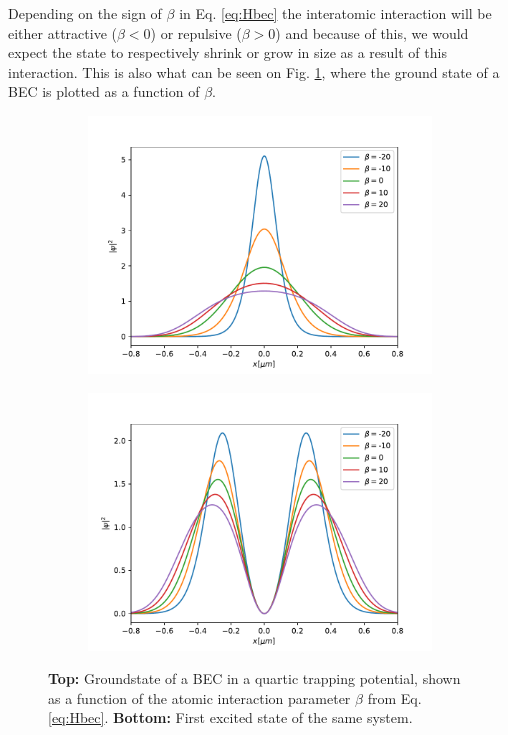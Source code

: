\documentclass[a4paper, twocolumn]{revtex4-1}
\begin{document}
Depending on the sign of $\beta$ in Eq. \eqref{eq:Hbec} the interatomic interaction will be either attractive ($\beta<0$) or repulsive ($\beta>0$) and because of this, we would expect the state to respectively shrink or grow in size as a result of this interaction. This is also what can be seen on Fig. \ref{fig:BECstates}, where the ground state of a BEC is plotted as a function of $\beta$.
\begin{figure}[h]
	\begin{subfigure}{\columnwidth}
		\includegraphics[width=\columnwidth]{graphics/stateAnalysis/GroundstateBeta.pdf}
	\end{subfigure}
	\begin{subfigure}{\columnwidth}
		\includegraphics[width=\columnwidth]{graphics/stateAnalysis/ExcitedstateBeta.pdf}
	\end{subfigure}
	\caption{\textbf{Top:} Groundstate of a BEC in a quartic trapping potential, shown as a function of the atomic interaction parameter $\beta$ from Eq. \eqref{eq:Hbec}. \textbf{Bottom:} First excited state of the same system.}
	\label{fig:BECstates}
\end{figure}
\end{document}
